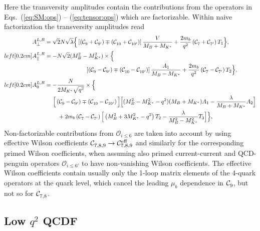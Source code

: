 Here the transversity amplitudes contain the contributions from the operators
in Eqs.~(\ref{eq:SM:ops}) -- (\ref{eq:tensor:ops}) which are factorizable.
Within naive factorization the transversity  amplitudes read
\begin{align}
  A_\perp^{L,R} & = \sqrt{2} N \sqrt{\lambda}
    \Big\lbrace\left\lbrack\left(\wilson{9} + \wilson[]{9'}\right) \mp \left(\wilson{10} + \wilson[]{10'}\right)\right\rbrack\frac{V}{M_B + M_{K^*}}
      + \frac{2 m_b}{q^2}\left(\wilson{7} + \wilson[]{7'}\right)T_1\Big\rbrace,
\\left\lbrack0.2cm]
  A_\parallel^{L,R} & = -N \sqrt{2}(M_B^2 - M_{K^*}^2) \times \Big\lbrace
\\ 
\nonumber & \hskip 2.5cm  
    \left\lbrack\left(\wilson{9} - \wilson[]{9'}\right) \mp \left(\wilson{10} - \wilson[]{10'}\right)\right\rbrack\frac{A_1}{M_B - M_{K^*}}
      + \frac{2 m_b}{q^2}\left(\wilson{7} - \wilson[]{7'}\right)T_2 \Big\rbrace,
\\left\lbrack0.2cm]
  A_0^{L,R} & = -\frac{N}{2 M_{K^*}\sqrt{q^2}} \times \Big\lbrace
\\
\nonumber & \hskip 0.5cm
    \Big[ \left(\wilson{9} - \wilson[]{9'}\right) \mp \left(\wilson{10} - \wilson[]{10'}\right) \Big]
    \Big[(M_B^2 - M_{K^*}^2 - q^2)(M_B + M_{K^*}) A_1 - \frac{\lambda}{M_B + M_{K^*}} A_2 \Big]
\\ \nonumber
    & \hskip 0.8cm + 2 m_b \left(\wilson{7} - \wilson[]{7'} \right)
        \Big[\left(M_B^2 + 3 M_{K^*}^2 - q^2\right)T_2 - \frac{\lambda}{M_B^2 - M_{K^*}^2}T_3\Big]
      \Big\rbrace  ,
\end{align}
Non-factorizable contributions from $\mathcal{O}_{i\leq 6}$  are taken into account
by using effective Wilson coefficients $\wilson[]{7,8,9} \to \wilson[eff]{7,8,9}$
and similarly for the corresponding primed Wilson coefficients, when assuming
also primed current-current and QCD-penguin operators $\mathcal{O}_{i\leq 6'}$ to have
non-vanishing Wilson coefficients.
The effective Wilson coefficients contain usually only the 1-loop matrix elements 
of the 4-quark operators at the quark level, which cancel the leading $\mu_b$
dependence in $\wilson[]{9}$, but not so for $\wilson[]{7,8}$.

%
\subsection{\boldmath Low $q^2$ QCDF \label{sec:trAmps:QCDF}}

